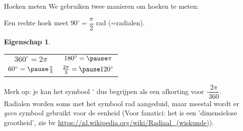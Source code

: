 \documentclass{beamer}
\newcommand{\degree}{^\circ}
\theoremstyle{eigenschap}
\newtheorem{proposition}{Eigenschap}
\providecommand{\p}{\pause}
\begin{document}
\begin{frame}
{
	\vfill
}
\end{frame}


\begin{frame}{Hoeken meten}
%
We gebruiken twee manieren om hoeken te meten:

\begin{definition}
	Een rechte hoek meet $90\degree = \dfrac{\pi}{2}$ rad (=radialen).
\end{definition}
%

\begin{proposition}
	\begin{tabular}{cc}
		$360\degree = 2\pi $ & $180\degree = \p\pi $ \\
		$ 60\degree =\p \frac{\pi}{3}$ & $\frac{2\pi}{3} = \p 120\degree$
	\end{tabular}
\end{proposition}
%
Merk op: je kan het symbool $\degree$ dus begrijpen als een afkorting voor $\cdot\dfrac{2\pi}{360}$. Radialen worden soms met het symbool rad aangeduid, maar meestal wordt er \textit{geen} symbool gebruikt voor de eenheid (Voor fanatici: het is een 'dimensielose grootheid', zie bv \url{https://nl.wikipedia.org/wiki/Radiaal\_(wiskunde)}).  

\end{frame}
\end{document}

